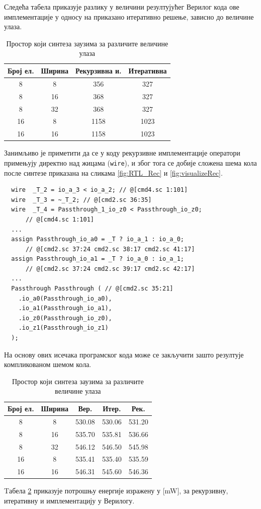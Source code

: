\documentclass[12pt, a4paper]{article}
\theoremstyle{definition}
\begin{document}
Следећа табела приказује разлику у величини резултујућег Верилог кода ове имплементације у односу на приказано итеративно решење, зависно до величине улаза.

\begin{table}[H]
\centering
 \begin{tabular}{| c | c | c c |}
  \hline
  Број ел. & Ширина & Рекурзивна и. & Итеративна \\
  \hline
  8 & 8  & 356 & 327 \\
  8 & 16 & 368 & 327 \\
  8 & 32 & 368 & 327 \\
  \hline
  16 & 8 & 1158 & 1023 \\
  16 & 16 & 1158 & 1023 \\
  \hline
 \end{tabular}
 \caption{Простор који синтеза заузима за различите величине улаза}
 \label{tab:brojLinija}
\end{table}

Занимљиво је приметити да се у коду рекурзивне имплементације оператори примењују директно над жицама (\verb+wire+), и због тога се добије сложена шема кола после синтезе приказана на сликама \ref{fig:RTL_Rec} и \ref{fig:visualizeRec}.

\begin{verbatim}
  wire  _T_2 = io_a_3 < io_a_2; // @[cmd4.sc 1:101]
  wire  _T_3 = ~_T_2; // @[cmd2.sc 36:35]
  wire  _T_4 = Passthrough_1_io_z0 < Passthrough_io_z0;
      // @[cmd4.sc 1:101]
  ...
  assign Passthrough_io_a0 = _T ? io_a_1 : io_a_0;
      // @[cmd2.sc 37:24 cmd2.sc 38:17 cmd2.sc 41:17]
  assign Passthrough_io_a1 = _T ? io_a_0 : io_a_1;
      // @[cmd2.sc 37:24 cmd2.sc 39:17 cmd2.sc 42:17]
  ...
  Passthrough Passthrough ( // @[cmd2.sc 35:21]
    .io_a0(Passthrough_io_a0),
    .io_a1(Passthrough_io_a1),
    .io_z0(Passthrough_io_z0),
    .io_z1(Passthrough_io_z1)
  );
\end{verbatim}

На основу ових исечака програмског кода може се закључити зашто резултује компликованом шемом кола.
\begin{table}[H]
\centering
 \begin{tabular}{| c | c | c c c |}
  \hline
  Број ел. & Ширина & Вер. & Итер. & Рек. \\
  \hline
  8 & 8  & 530.08 & 530.06 & 531.20 \\
  8 & 16 & 535.70 & 535.81 & 536.66 \\
  8 & 32 & 546.12 & 546.50 & 545.98 \\
  \hline
  16 & 8 & 535.41 & 535.40 & 535.59 \\
  16 & 16 & 546.31 & 545.60 & 546.36 \\
  \hline
 \end{tabular}
 \caption{Простор који синтеза заузима за различите величине улаза}
 \label{tab:potrosnja}
\end{table}
Tабела \ref{tab:potrosnja} приказује потрошњу енергије изражену у [mW], за рекурзивну, итеративну и имплементацију у Верилогу.
\end{document}
